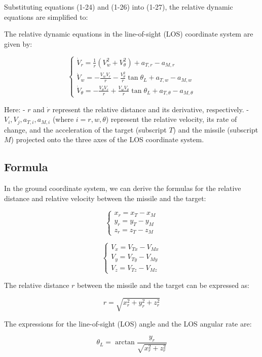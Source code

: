 \documentclass{article}
\begin{document}
Substituting equations (1-24) and (1-26) into (1-27), the relative dynamic equations are simplified to:


The relative dynamic equations in the line-of-sight (LOS) coordinate system are given by:

\[
\begin{cases}
\dot{V}_r = \frac{1}{r} \left( V_w^2 + V_\theta^2 \right) + a_{T,r} - a_{M,r} \\
\dot{V}_w = -\frac{V_w V_r}{r} - \frac{V_\theta^2}{r} \tan \theta_L + a_{T,w} - a_{M,w} \\
\dot{V}_\theta = -\frac{V_\theta V_r}{r} + \frac{V_w V_\theta}{r} \tan \theta_L + a_{T,\theta} - a_{M,\theta}
\end{cases}
\tag{1-28}
\]

Here:
- \( r \) and \( \dot{r} \) represent the relative distance and its derivative, respectively.
- \( V_i, V_j, a_{T,i}, a_{M,i} \) (where \( i = r, w, \theta \)) represent the relative velocity, its rate of change, and the acceleration of the target (subscript \( T \)) and the missile (subscript \( M \)) projected onto the three axes of the LOS coordinate system.


\newpage
\subsection{Formula}

In the ground coordinate system, we can derive the formulas for the relative distance and relative velocity between the missile and the target:

\[
\begin{cases} 
x_r = x_T - x_M \\ 
y_r = y_T - y_M \\ 
z_r = z_T - z_M 
\end{cases}
\tag{1-29}
\]

\[
\begin{cases} 
V_x = V_{Tx} - V_{Mx} \\ 
V_y = V_{Ty} - V_{My} \\ 
V_z = V_{Tz} - V_{Mz} 
\end{cases}
\tag{1-30}
\]

The relative distance \( r \) between the missile and the target can be expressed as:

\[
r = \sqrt{x_r^2 + y_r^2 + z_r^2}
\tag{1-31}
\]

The expressions for the line-of-sight (LOS) angle and the LOS angular rate are:

\[
\theta_L = \arctan \frac{y_r}{\sqrt{x_r^2 + z_r^2}}
\tag{1-32}
\]
\end{document}
